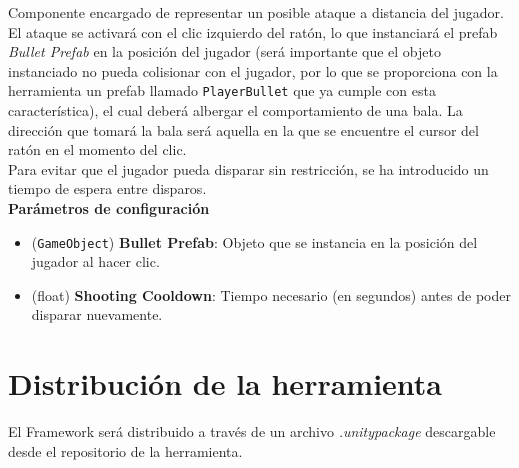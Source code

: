 Componente encargado de representar un posible ataque a distancia del jugador. El ataque se activará con el clic izquierdo del ratón, lo que instanciará el prefab \textit{Bullet Prefab} en la posición del jugador (será importante que el objeto instanciado no pueda colisionar con el jugador, por lo que se proporciona con la herramienta un prefab llamado \texttt{PlayerBullet} que ya cumple con esta característica), el cual deberá albergar el comportamiento de una bala. La dirección que tomará la bala será aquella en la que se encuentre el cursor del ratón en el momento del clic.\\

Para evitar que el jugador pueda disparar sin restricción, se ha introducido un tiempo de espera entre disparos.\\

\textbf{Parámetros de configuración}
\begin{itemize}
	\item (\texttt{GameObject}) \textbf{Bullet Prefab}: Objeto que se instancia en la posición del jugador al hacer clic.
	\item (float) \textbf{Shooting Cooldown}: Tiempo necesario (en segundos) antes de poder disparar nuevamente.
\end{itemize}

\section {Distribución de la herramienta}

El Framework será distribuido a través de un archivo \textit{.unitypackage} descargable desde el repositorio de la herramienta.\\

